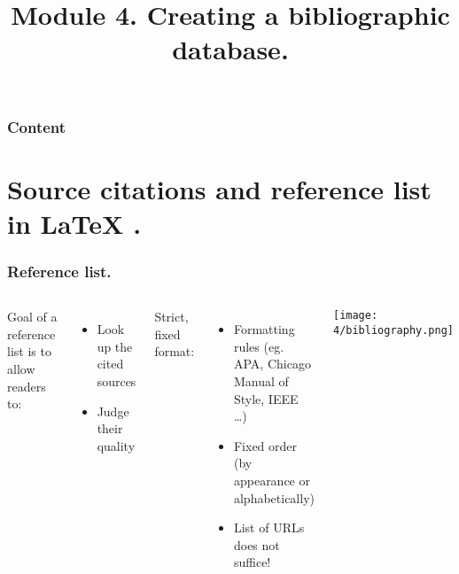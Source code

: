 \documentclass[aspectratio=169]{beamer}
\title{Module 4. Creating a bibliographic database.}
\subtitle{\coursename}
\author{\lecturers}   %
\date{\academicyear}
\begin{document}
\begin{frame}
  \maketitle
\end{frame}

\begin{frame}
  \frametitle{Content}

  \tableofcontents
\end{frame}

\section{Source citations and reference list in {\LaTeX} .}

\begin{frame}[plain]
	\frametitle{Reference list.}
	
	
	\begin{columns}[c]
		
		Goal of a reference list is to allow readers to:
		
		
		\begin{itemize}
			\item Look up the cited sources
			\item Judge their quality
		\end{itemize}
		
		{\pause}
		
		Strict, fixed format:
		
		\begin{itemize}
			\item Formatting rules (eg. APA, Chicago Manual of Style, IEEE \ldots)
			\item Fixed order (by appearance or alphabetically)
			\item List of URLs does not suffice!
		\end{itemize}
		
		{\pause}
		
		\begin{center}
			\texttt{[image: 4/bibliography.png]}
		\end{center}
		
	\end{columns}
	
	
	{\pause}
	
	
\end{frame}
\end{document}
